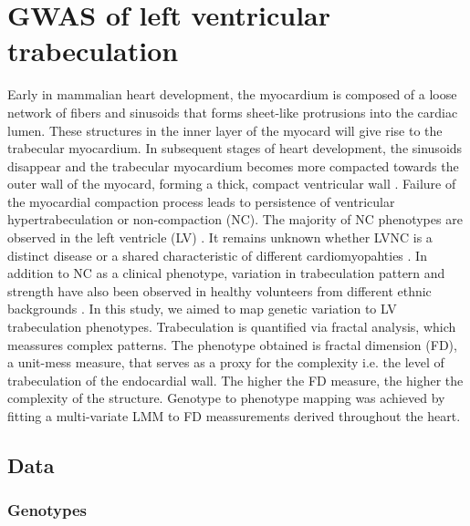 \section{GWAS of left ventricular trabeculation}
\label{section:GWAS_FD}
Early in mammalian heart development, the myocardium is composed of a loose network of fibers and sinusoids that forms sheet-like protrusions into the cardiac lumen. These structures in the inner layer of the myocard will give rise to the trabecular myocardium. In subsequent stages of heart development, the sinusoids disappear and the trabecular myocardium becomes more compacted towards the outer wall of the myocard, forming a thick, compact ventricular wall \citep{Chen2009,Yousef2009}. Failure of the myocardial compaction process leads to persistence of ventricular hypertrabeculation or non-compaction (NC). The majority of NC phenotypes are observed in the left ventricle (LV) \citep{Zambrano2002}. It remains unknown whether LVNC is a distinct disease or a shared characteristic of different cardiomyopahties \citep{Captur2013}. In addition to NC as a clinical phenotype, variation in trabeculation pattern and strength have also been observed in healthy volunteers from different ethnic backgrounds \citep{Kawel2012,Captur2015}. In this study, we aimed to map genetic variation to LV trabeculation phenotypes. Trabeculation is quantified via fractal analysis, which meassures complex patterns. The phenotype obtained is fractal dimension (FD), a unit-mess measure, that serves as a proxy for the complexity i.e. the level of trabeculation of the endocardial wall. The higher the FD measure, the higher the complexity  of the structure. Genotype to phenotype mapping was achieved by fitting a multi-variate LMM to FD meassurements derived throughout the heart.

\subsection{Data}
\subsubsection{Genotypes}
\label{sssec:gentoypes}

